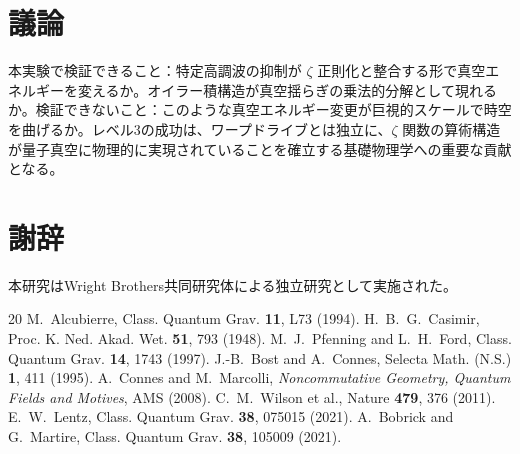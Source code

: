 \documentclass[11pt,a4paper]{article}
\begin{document}
\section{議論}

本実験で検証できること：特定高調波の抑制が $\zeta$ 正則化と整合する形で真空エネルギーを変えるか。オイラー積構造が真空揺らぎの乗法的分解として現れるか。検証できないこと：このような真空エネルギー変更が巨視的スケールで時空を曲げるか。レベル3の成功は、ワープドライブとは独立に、$\zeta$ 関数の算術構造が量子真空に物理的に実現されていることを確立する基礎物理学への重要な貢献となる。

\section*{謝辞}
本研究はWright Brothers共同研究体による独立研究として実施された。

\begin{thebibliography}{20}
 M.~Alcubierre, Class. Quantum Grav. \textbf{11}, L73 (1994).
 H.~B.~G.~Casimir, Proc. K. Ned. Akad. Wet. \textbf{51}, 793 (1948).
 M.~J.~Pfenning and L.~H.~Ford, Class. Quantum Grav. \textbf{14}, 1743 (1997).
 J.-B.~Bost and A.~Connes, Selecta Math. (N.S.) \textbf{1}, 411 (1995).
 A.~Connes and M.~Marcolli, \emph{Noncommutative Geometry, Quantum Fields and Motives}, AMS (2008).
 C.~M.~Wilson et al., Nature \textbf{479}, 376 (2011).
 E.~W.~Lentz, Class. Quantum Grav. \textbf{38}, 075015 (2021).
 A.~Bobrick and G.~Martire, Class. Quantum Grav. \textbf{38}, 105009 (2021).
\end{thebibliography}
\end{document}
